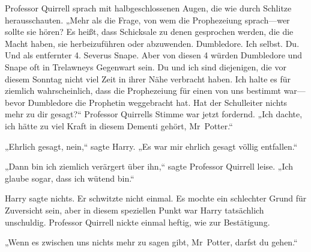 Professor Quirrell sprach mit halbgeschlossenen Augen, die wie durch Schlitze herausschauten. „Mehr als die Frage, von wem die Prophezeiung sprach—wer sollte sie hören? Es heißt, dass Schicksale zu denen gesprochen werden, die die Macht haben, sie herbeizuführen oder abzuwenden. Dumbledore. Ich selbst. Du. Und als entfernter 4. Severus Snape. Aber von diesen 4 würden Dumbledore und Snape oft in Trelawneys Gegenwart sein. Du und ich sind diejenigen, die vor diesem Sonntag nicht viel Zeit in ihrer Nähe verbracht haben. Ich halte es für ziemlich wahrscheinlich, dass die Prophezeiung für einen von uns bestimmt war—bevor Dumbledore die Prophetin weggebracht hat. Hat der Schulleiter nichts mehr zu dir gesagt?“ Professor Quirrells Stimme war jetzt fordernd. „Ich dachte, ich hätte zu viel Kraft in diesem Dementi gehört, Mr~Potter.“

„Ehrlich gesagt, nein,“ sagte Harry. „Es war mir ehrlich gesagt völlig entfallen.“

„Dann bin ich ziemlich verärgert über ihn,“ sagte Professor Quirrell leise. „Ich glaube sogar, dass ich wütend bin.“

Harry sagte nichts. Er schwitzte nicht einmal. Es mochte ein schlechter Grund für Zuversicht sein, aber in diesem speziellen Punkt war Harry tatsächlich unschuldig. Professor Quirrell nickte einmal heftig, wie zur Bestätigung.

„Wenn es zwischen uns nichts mehr zu sagen gibt, Mr~Potter, darfst du gehen.“

